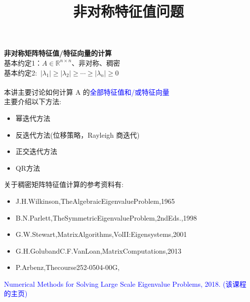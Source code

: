 \documentclass[12pt,a4paper]{article}
\title{非对称特征值问题}
\begin{document}
\maketitle
\noindent \textbf{非对称矩阵特征值/特征向量的计算}\\
基本约定1：$A \in \mathbb{R}^{n \times n}$、非对称、稠密\\
基本约定2:~$\left|\lambda_{1}\right| \geq\left|\lambda_{2}\right| \geq \cdots \geq\left|\lambda_{n}\right| \geq 0$\\
\\
本讲主要讨论如何计算 A 的\textcolor{blue}{全部特征值和/或特征向量}\\
主要介绍以下方法:\\
\begin{itemize}
\item 幂迭代方法
\item  反迭代方法(位移策略，Rayleigh 商迭代) \item 正交迭代方法
\item QR方法
\end{itemize}
关于稠密矩阵特征值计算的参考资料有:\\
\begin{itemize}
\item J.H.Wilkinson,TheAlgebraicEigenvalueProblem,1965
\item B.N.Parlett,TheSymmetricEigenvalueProblem,2ndEds.,1998
\item G.W.Stewart,MatrixAlgorithms,VolII:Eigensystems,2001
\item G.H.GolubandC.F.VanLoan,MatrixComputations,2013
\item P.Arbenz,Thecourse252-0504-00G,
\end{itemize}
\textcolor{blue}{Numerical Methods for Solving Large Scale Eigenvalue Problems, 2018.
(该课程的主页)}
\end{document}
